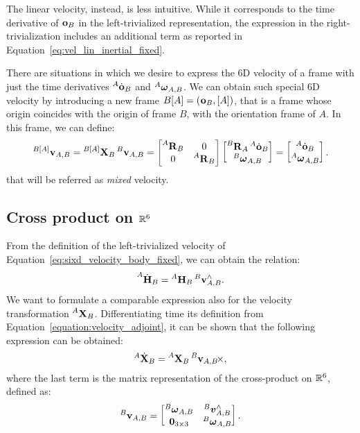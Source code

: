 The linear velocity, instead, is less intuitive.
While it corresponds to the time derivative of $\ori_B$ in the left-trivialized representation, the expression in the right-trivialization includes an additional term as reported in Equation~\eqref{eq:vel_lin_inertial_fixed}.

There are situations in which we desire to express the 6D velocity of a frame with just the time derivatives $\orid[A]_B$ and $\velang[A]_{A,B}$.
We can obtain such special 6D velocity by introducing a new frame $B[A] = (\ori_B, [A])$, that is a frame whose origin coincides with the origin of frame $B$, with the orientation frame of $A$.
In this frame, we can define:
%
\begin{equation}
    \label{eq:mixed_velocity}
    \velsix[{B[A]}]_{A,B} =
    \transvel[{B[A]}]_B \velsix[B]_{A,B} =
    \begin{bmatrix}
        \rot[A]_B & 0 \\ 0 & \rot[A]_B
    \end{bmatrix}
    \begin{bmatrix}
        \rot[B]_A \orid[A]_B \\ \velang[B]_{A,B}
    \end{bmatrix}
    =
    \begin{bmatrix}
        \orid[A]_B \\ \velang[A]_{A,B}
    \end{bmatrix}
    .
\end{equation}
%
that will be referred as \emph{mixed} velocity.

\subsection{Cross product on $\realn^6$}

From the definition of the left-trivialized velocity of Equation~\eqref{eq:sixd_velocity_body_fixed}, we can obtain the relation:
%
\begin{equation*}
    \homod[A]_B = \homo[A]_B \velsix[B]_{A,B}^\wedge
    .
\end{equation*}
%
We want to formulate a comparable expression also for the velocity transformation $\transvel[A]_B$.
Differentiating \wrtl time its definition from Equation~\eqref{equation:velocity_adjoint}, it can be shown that the following expression can be obtained:
%
\begin{equation}
    \label{eq:X_dot}
    {}^A \dot{\mathbf{X}}_B = \transvel[A]_B \crossvelsix[{\velsix[B]_{A,B}}]
    ,
\end{equation}
%
where the last term is the matrix representation of the cross-product on $\realn^6$, defined as:
%
\begin{equation*}
    \velsix[B]_{A,B} =
    \begin{bmatrix}
        \velang[B]_{A,B} & \vellin[B]_{A,B}^\wedge \\
        \zeros_{3\times 3} & \velang[B]_{A,B}
    \end{bmatrix}
    .
\end{equation*}

